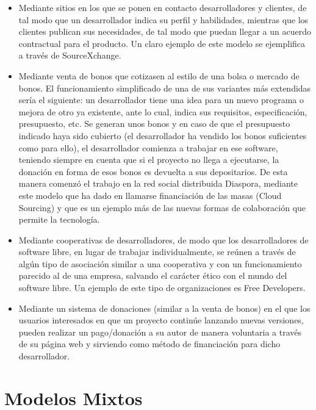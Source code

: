 \begin{itemize}
  \item Mediante sitios en los que se ponen en contacto desarrolladores y
clientes, de tal modo que un desarrollador indica su perfil y habilidades,
mientras que los clientes publican sus necesidades, de tal modo que puedan
llegar a un acuerdo contractual para el producto. Un claro ejemplo de este
modelo se ejemplifica a través de SourceXchange.
  \item Mediante venta de bonos que cotizasen al estilo de una bolsa o mercado
de bonos. El funcionamiento simplificado de una de sus variantes más extendidas
sería el siguiente: un desarrollador tiene una idea para un nuevo programa o
mejora de otro ya existente, ante lo cual, indica sus requisitos,
especificación, presupuesto, etc. Se generan unos bonos y en caso de que el
presupuesto indicado haya sido cubierto (el desarrollador ha vendido los bonos
suficientes como para ello), el desarrollador comienza a trabajar en ese
software, teniendo siempre en cuenta que si el proyecto no llega a ejecutarse,
la donación en forma de esos bonos es devuelta a sus depositarios. De esta
manera comenzó el trabajo en la red social distribuida Diaspora, mediante este
modelo que ha dado en llamarse financiación de las masas (Cloud Sourcing) y que
es un ejemplo más de las nuevas formas de colaboración que permite la
tecnología.
  \item Mediante cooperativas de desarrolladores, de modo que los
desarrolladores de software libre, en lugar de trabajar individualmente, se
reúnen a través de algún tipo de asociación similar a una cooperativa y con un
funcionamiento parecido al de una empresa, salvando el carácter ético con el
mundo del software libre. Un ejemplo de este tipo de organizaciones es Free
Developers.
  \item Mediante un sistema de donaciones (similar a la venta de bonos) en el
que los usuarios interesados en que un proyecto continúe lanzando nuevas
versiones, pueden realizar un pago/donación a su autor de manera voluntaria a
través de su página web y sirviendo como método de financiación para dicho
desarrollador.
\end{itemize}

\section{Modelos Mixtos}

